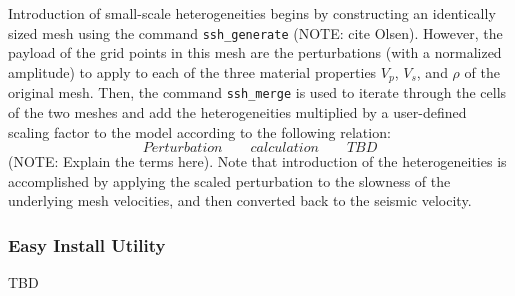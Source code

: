 Introduction of small-scale heterogeneities begins by constructing an identically sized mesh using the command \texttt{ssh\_generate} (NOTE: cite Olsen). However, the payload of the grid points in this mesh are the perturbations (with a normalized amplitude) to apply to each of the three material properties $V_p$, $V_s$, and $\rho$ of the original mesh. Then, the command \texttt{ssh\_merge} is used to iterate through the cells of the two meshes and add the heterogeneities multiplied by a user-defined scaling factor to the model according to the following relation:
\begin{equation}
Perturbation \qquad calculation \qquad TBD
\end{equation}
(NOTE: Explain the terms here). Note that introduction of the heterogeneities is accomplished by applying the scaled perturbation to the slowness of the underlying mesh velocities, and then converted back to the seismic velocity. 

\subsubsection{Easy Install Utility}

TBD
